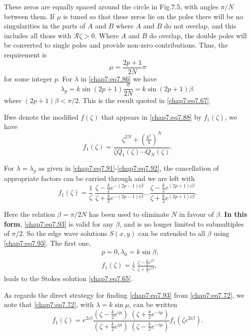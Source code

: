 {{These zeros are equally spaced around the circle in Fig.7.5, with angles $\pi/N$ between them. If $\mu$ is tuned so that these zeros lie on the poles there will be no singularities in the parts of $A$ and $B$ where $A$ and $B$ do not overlap, and this includes all those with $\mathscr{R}\zeta >0$. Where $A$ and $B$ do overlap, the double poles will be converted to single poles and provide non-zero contributions. Thus, the requirement is 
\begin{equation}
\mu=\frac{2p+1}{2N}\pi\tag{7.91}\label{chap7:eq7.91}
\end{equation}
for some integer $p$. For $\lambda$ in \eqref{chap7:eq7.86} we have
\begin{equation}
\lambda_p=k\sin(2p+1)\frac{\pi}{2N}=k\sin(2p+1)\beta. \tag{7.92}\label{chap7:eq7.92}
\end{equation}
where $(2p+1)\beta<\pi/2$. This is the result quoted in \eqref{chap7:eq7.67}.

If\pageoriginale we denote the modified $f(\zeta)$ that appears in \eqref{chap7:eq7.88} by $f_1(\zeta)$, we have 
$$
f_1(\zeta)=\frac{\zeta^{2N}+\left(\frac{k^2}{4}\right)^N}{\zeta Q_1(\zeta)\cdots Q_N(\zeta)}.
$$

For $\lambda=\lambda_p$ as given in \eqref{chap7:eq7.91}-\eqref{chap7:eq7.92}, the cancellation of appropriate factors can be carried through and we are left with 
\begin{equation}
f_1(\zeta)=\frac{1}{\zeta}\;\frac{\zeta-\frac{k}{2} e^{-(2p-1)i\beta}}{\zeta+ \frac{k}{2} e^{-(2p-1)i\beta}}\ldots \frac{\zeta-\frac{k}{2} e^{(2p+1)i\beta}} {\zeta+\frac{k}{2} e^{(2p+1)i\beta}}.\tag{7.93}\label{chap7:eq7.93}
\end{equation}

Here the relation $\beta =\pi/2N$ has been used to eliminate $N$ in favour of $\beta$. {\bf In this form}, \eqref{chap7:eq7.93} is valid for any $\beta$, and is no longer limited to submultiples of $\pi/2$. So the edge wave solutions $S(x,y)$ can be extended to all $\beta$ using \eqref{chap7:eq7.93}. The first one, 
\begin{align*}
& p=0, \lambda_0=k\sin\beta,\\
&f_1(\zeta)=\frac{1}{\zeta}\;\frac{\zeta-\frac{k}{2} e^{i\beta}}{\zeta+ \frac{k}{2}e^{i\beta}},\tag{7.94}\label{chap7:eq7.94}
\end{align*}
leads to the Stokes solution \eqref{chap7:eq7.65}.

As regards the direct strategy for finding \eqref{chap7:eq7.93} from \eqref{chap7:eq7.72}, we note that \eqref{chap7:eq7.72}, with $\lambda=k\sin \mu$, can be written 
\begin{equation}
f_1(\zeta)=e^{2i\beta}\frac{\left(\zeta-\frac{k}{2}e^{i\mu}\right)\;\left(\zeta+ \frac{k}{2}e^{-i\mu}\right)}{\left(\zeta+\frac{k}{2}e^{i\mu}\right)\;\left(\zeta- \frac{k}{2}e^{-i\mu}\right)}f_1\left(\zeta e^{2i\beta}\right). \tag{7.95}\label{chap7:eq7.95}
\end{equation}

}}
